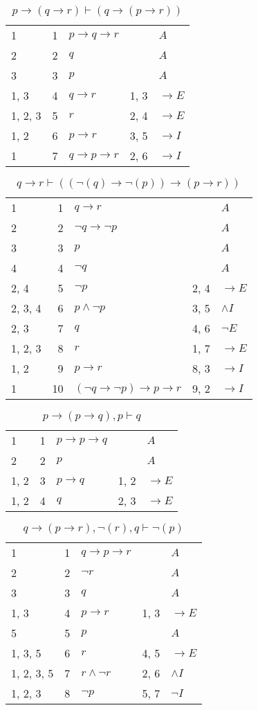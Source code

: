 \documentclass{article}
\begin{document}
\begin{table}[htbp]\caption*{$p→(q→r) ⊢ (q→(p→r))$}\centering\begin{tabular}{lrlll}
{1} & 1 & $p→q→r$ & {} & $A$ \\
{2} & 2 & $q$ & {} & $A$ \\
{3} & 3 & $p$ & {} & $A$ \\
{1, 3} & 4 & $q→r$ & {1, 3} & $→E$ \\
{1, 2, 3} & 5 & $r$ & {2, 4} & $→E$ \\
{1, 2} & 6 & $p→r$ & {3, 5} & $→I$ \\
{1} & 7 & $q→p→r$ & {2, 6} & $→I$ \\
\end{tabular}
\end{table}
\begin{table}[htbp]\caption*{$q→r ⊢ ((¬(q)→ ¬(p))→ (p→r))$}\centering\begin{tabular}{lrlll}
{1} & 1 & $q→r$ & {} & $A$ \\
{2} & 2 & $¬q→ ¬p$ & {} & $A$ \\
{3} & 3 & $p$ & {} & $A$ \\
{4} & 4 & $¬q$ & {} & $A$ \\
{2, 4} & 5 & $¬p$ & {2, 4} & $→E$ \\
{2, 3, 4} & 6 & $p∧ ¬p$ & {3, 5} & $∧I$ \\
{2, 3} & 7 & $q$ & {4, 6} & $¬E$ \\
{1, 2, 3} & 8 & $r$ & {1, 7} & $→E$ \\
{1, 2} & 9 & $p→r$ & {8, 3} & $→I$ \\
{1} & 10 & $(¬q→ ¬p)→p→r$ & {9, 2} & $→I$ \\
\end{tabular}
\end{table}
\begin{table}[htbp]\caption*{$p → (p → q),p ⊢ q$}\centering\begin{tabular}{lrlll}
{1} & 1 & $p→p→q$ & {} & $A$ \\
{2} & 2 & $p$ & {} & $A$ \\
{1, 2} & 3 & $p→q$ & {1, 2} & $→E$ \\
{1, 2} & 4 & $q$ & {2, 3} & $→E$ \\
\end{tabular}
\end{table}
\begin{table}[htbp]\caption*{$q → (p → r),¬(r),q ⊢ ¬(p)$}\centering\begin{tabular}{lrlll}
{1} & 1 & $q→p→r$ & {} & $A$ \\
{2} & 2 & $¬r$ & {} & $A$ \\
{3} & 3 & $q$ & {} & $A$ \\
{1, 3} & 4 & $p→r$ & {1, 3} & $→E$ \\
{5} & 5 & $p$ & {} & $A$ \\
{1, 3, 5} & 6 & $r$ & {4, 5} & $→E$ \\
{1, 2, 3, 5} & 7 & $r∧ ¬r$ & {2, 6} & $∧I$ \\
{1, 2, 3} & 8 & $¬p$ & {5, 7} & $¬I$ \\
\end{tabular}
\end{table}
\end{document}
